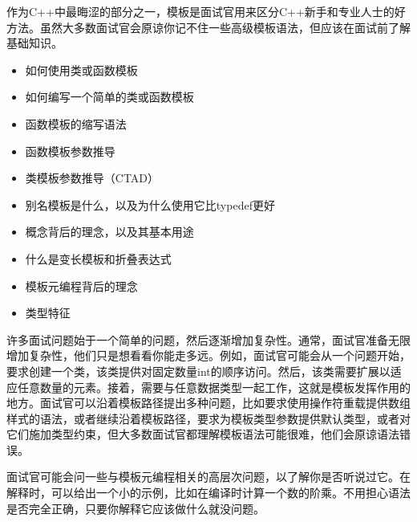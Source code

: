 
作为C++中最晦涩的部分之一，模板是面试官用来区分C++新手和专业人士的好方法。虽然大多数面试官会原谅你记不住一些高级模板语法，但应该在面试前了解基础知识。


\begin{itemize}
\item
如何使用类或函数模板

\item
如何编写一个简单的类或函数模板

\item
函数模板的缩写语法

\item
函数模板参数推导

\item
类模板参数推导（CTAD）

\item
别名模板是什么，以及为什么使用它比typedef更好

\item
概念背后的理念，以及其基本用途

\item
什么是变长模板和折叠表达式

\item
模板元编程背后的理念

\item
类型特征
\end{itemize}


许多面试问题始于一个简单的问题，然后逐渐增加复杂性。通常，面试官准备无限增加复杂性，他们只是想看看你能走多远。例如，面试官可能会从一个问题开始，要求创建一个类，该类提供对固定数量int的顺序访问。然后，该类需要扩展以适应任意数量的元素。接着，需要与任意数据类型一起工作，这就是模板发挥作用的地方。面试官可以沿着模板路径提出多种问题，比如要求使用操作符重载提供数组样式的语法，或者继续沿着模板路径，要求为模板类型参数提供默认类型，或者对它们施加类型约束，但大多数面试官都理解模板语法可能很难，他们会原谅语法错误。

面试官可能会问一些与模板元编程相关的高层次问题，以了解你是否听说过它。在解释时，可以给出一个小的示例，比如在编译时计算一个数的阶乘。不用担心语法是否完全正确，只要你解释它应该做什么就没问题。









